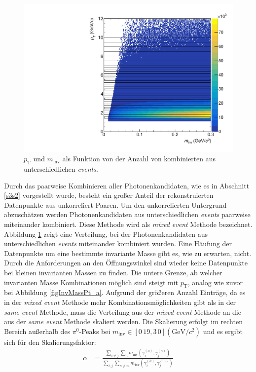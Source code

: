 \begin{figure}[tp]
\centering
\includegraphics[width=.7\linewidth]{hInvMass_pT_Bkg.pdf}
\caption{$p_\text{T}$ und $m_\text{inv}$ als Funktion von der Anzahl von kombinierten   aus unterschiedlichen \textit{events}.}
\label{figInvMassPt_b}
\end{figure}
Durch das paarweise Kombinieren aller Photonenkandidaten, wie es in Abschnitt \ref{s3s2} vorgestellt wurde, besteht ein großer Anteil der rekonstruierten Datenpunkte aus unkorreliert Paaren.
Um den unkorrelierten Untergrund abzuschätzen werden Photonenkandidaten aus unterschiedlichen \textit{events} paarweise miteinander kombiniert.
Diese Methode wird als \textit{mixed event} Methode bezeichnet.
Abbildung \ref{figInvMassPt_b} zeigt eine Verteilung, bei der Photonenkandidaten aus unterschiedlichen \textit{events} miteinander kombiniert wurden.
Eine Häufung der Datenpunkte um eine bestimmte invariante Masse gibt es, wie zu erwarten, nicht.
Durch die Anforderungen an den Öffnungswinkel sind wieder keine Datenpunkte bei kleinen invarianten Massen zu finden.
Die untere Grenze, ab welcher invarianten Masse Kombinationen möglich sind steigt mit $p_\text{T}$, analog wie zuvor bei Abbildung  \ref{figInvMassPt_a}.
\newline
Aufgrund der größeren Anzahl Einträge, da es in der \textit{mixed event} Methode mehr Kombinationsmöglichkeiten gibt als in der \textit{same event} Methode, muss die Verteilung aus der \textit{mixed event} Methode an die aus der \textit{same event} Methode skaliert werden.
Die Skalierung erfolgt im rechten Bereich außerhalb des $\pi^{0}$-Peaks bei $m_\text{inv} \in \left[0\,19,3\,0\right] (\text{GeV/}c^{2})$ und es ergibt sich für den Skalierungsfaktor:
\begin{align}
\label{eqBackSkalierung}
\alpha &= \frac{\sum_{i \neq j}\sum_{n}m_{\text{inv}}\left( \gamma^{(n)}_{i},\gamma^{(n)}_{j}\right) }{\sum_{i,j}\sum_{n \neq m}m_{\text{inv}}\left( \gamma^{(n)}_{i},\gamma^{(m)}_{j}\right) }
\end{align}
